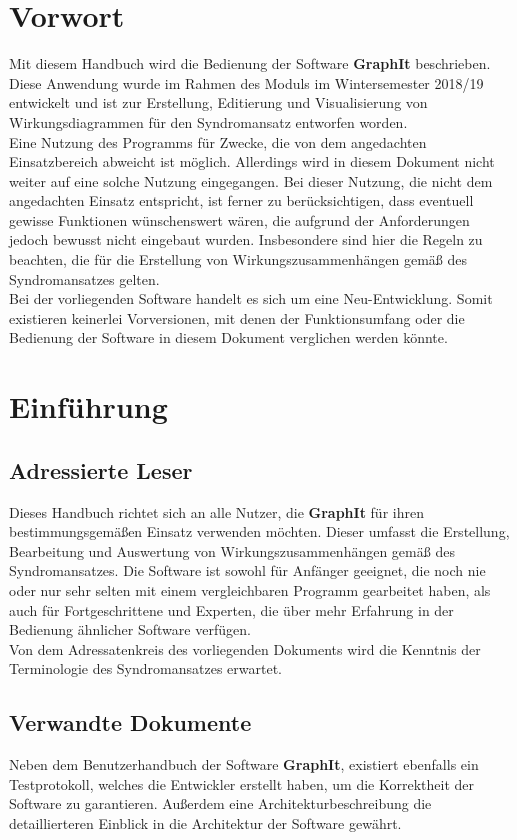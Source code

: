 \documentclass[enabledeprecatedfontcommands,fontsize=11pt,paper=a4,twoside]{scrartcl}
\newcounter{one}
\newcounter{two}[one]
\begin{document}
\section*{Vorwort}
Mit diesem Handbuch wird die Bedienung der Software \textbf{GraphIt} beschrieben. Diese Anwendung wurde im Rahmen des Moduls \grqq{} im Wintersemester 2018/19 entwickelt und ist zur Erstellung, Editierung und Visualisierung von Wirkungsdiagrammen für den Syndromansatz entworfen worden. \\
Eine Nutzung des Programms für Zwecke, die von dem angedachten Einsatzbereich abweicht ist möglich. Allerdings wird in diesem Dokument nicht weiter auf eine solche Nutzung eingegangen. Bei dieser Nutzung, die nicht dem angedachten Einsatz entspricht, ist ferner zu berücksichtigen, dass eventuell gewisse Funktionen wünschenswert wären, die aufgrund der Anforderungen jedoch bewusst nicht eingebaut wurden. Insbesondere sind hier die Regeln zu beachten, die für die Erstellung von Wirkungszusammenhängen gemäß des Syndromansatzes gelten. \\
Bei der vorliegenden Software handelt es sich um eine Neu-Entwicklung. Somit existieren keinerlei Vorversionen, mit denen der Funktionsumfang oder die Bedienung der Software in diesem Dokument verglichen werden könnte. 

\section{Einführung}
\subsection{Adressierte Leser}
Dieses Handbuch richtet sich an alle Nutzer, die \textbf{GraphIt} für ihren bestimmungsgemäßen Einsatz verwenden möchten. Dieser umfasst die Erstellung, Bearbeitung und Auswertung von Wirkungszusammenhängen gemäß des Syndromansatzes. Die Software ist sowohl für Anfänger geeignet, die noch nie oder nur sehr selten mit einem vergleichbaren Programm gearbeitet haben, als auch für Fortgeschrittene und Experten, die über mehr Erfahrung in der Bedienung ähnlicher Software verfügen. \\
Von dem Adressatenkreis des vorliegenden Dokuments wird die Kenntnis der Terminologie des Syndromansatzes erwartet.  
\subsection{Verwandte Dokumente}
Neben dem Benutzerhandbuch der Software \textbf{GraphIt}, existiert ebenfalls ein Testprotokoll, welches die Entwickler erstellt haben, um die Korrektheit der Software zu garantieren. Außerdem eine Architekturbeschreibung die detaillierteren Einblick in die Architektur der Software gewährt. 
\end{document}
